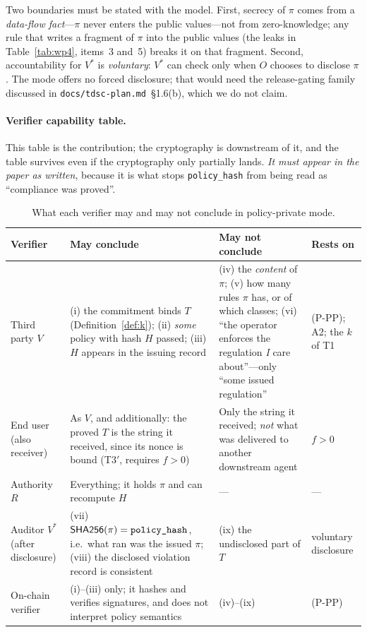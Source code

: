 \documentclass[journal]{IEEEtran}
\begin{document}
Two boundaries must be stated with the model. First, secrecy of $\pi$ comes
from a \emph{data-flow fact}---$\pi$ never enters the public values---not from
zero-knowledge; any rule that writes a fragment of $\pi$ into the public values
(the leaks in Table~\ref{tab:wp4}, items~3 and~5) breaks it on that fragment.
Second, accountability for $V^{*}$ is \emph{voluntary}: $V^{*}$ can check only
when $O$ chooses to disclose $\pi$. The mode offers no forced disclosure; that
would need the release-gating family discussed in
\texttt{docs/tdsc-plan.md}~\S1.6(b), which we do not claim.

\paragraph{Verifier capability table.} This table is the contribution; the
cryptography is downstream of it, and the table survives even if the
cryptography only partially lands. \emph{It must appear in the paper as
written}, because it is what stops \texttt{policy\_hash} from being read as
``compliance was proved''.

\begin{table}[t]
\centering
\caption{What each verifier may and may not conclude in policy-private mode.}
\label{tab:wp4-capability}
\footnotesize
\setlength{\tabcolsep}{3pt}
\begin{tabular}{@{}L{0.14\columnwidth}L{0.31\columnwidth}L{0.30\columnwidth}L{0.17\columnwidth}@{}}
\toprule
Verifier & \textbf{May} conclude & \textbf{May not} conclude & Rests on \\
\midrule
Third party $V$ & (i) the commitment binds $T$
(Definition~\ref{def:k}); (ii) \emph{some} policy with hash $H$ passed;
(iii) $H$ appears in the issuing record & (iv) the \emph{content} of $\pi$;
(v) how many rules $\pi$ has, or of which classes; (vi) ``the operator
enforces the regulation \emph{I} care about''---only ``some issued
regulation'' & (P-PP); A2; the $k$ of T1 \\
End user (also receiver) & As $V$, and additionally: the proved $T$ is the
string it received, since its nonce is bound (T3$'$, requires $f>0$) & Only
the string it received; \emph{not} what was delivered to another downstream
agent & $f>0$ \\
Authority $R$ & Everything; it holds $\pi$ and can recompute $H$ & --- & --- \\
Auditor $V^{*}$ (after disclosure) & (vii) $\mathsf{SHA256}(\pi) =
\texttt{policy\_\allowbreak hash}$, i.e.\ what ran was the issued $\pi$;
(viii) the disclosed violation record is consistent & (ix) the undisclosed
part of $T$ & voluntary disclosure \\
On-chain verifier & (i)--(iii) only; it hashes and verifies signatures, and
does not interpret policy semantics & (iv)--(ix) & (P-PP) \\
\bottomrule
\end{tabular}
\end{table}
\end{document}
